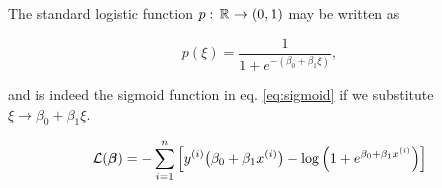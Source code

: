 The standard logistic function $p:\, \mathbb{R}^{} \to (0,1)$ may be written as 

\begin{equation}\label{eq:logistic_function}
    p(\xi) = \frac{1}{1+e^{-(\beta_0 + \beta_1\xi)}},
\end{equation}

and is indeed the sigmoid function in eq. \eqref{eq:sigmoid} if we substitute $\xi \to \beta_0 + \beta_1 \xi$. 
\fillertext

\begin{equation}\label{eq:logistic_cost_function}
    \mathcal{L}(\boldsymbol{\beta}) = - \sum_{i=1}^n \Big[ y^{(i)} \big(\beta_0+ \beta_1 x^{(i)}\big) - \log{\Big(1+e^{\beta_0 + \beta_1 x^{(i)}}\Big)} \Big]
\end{equation}